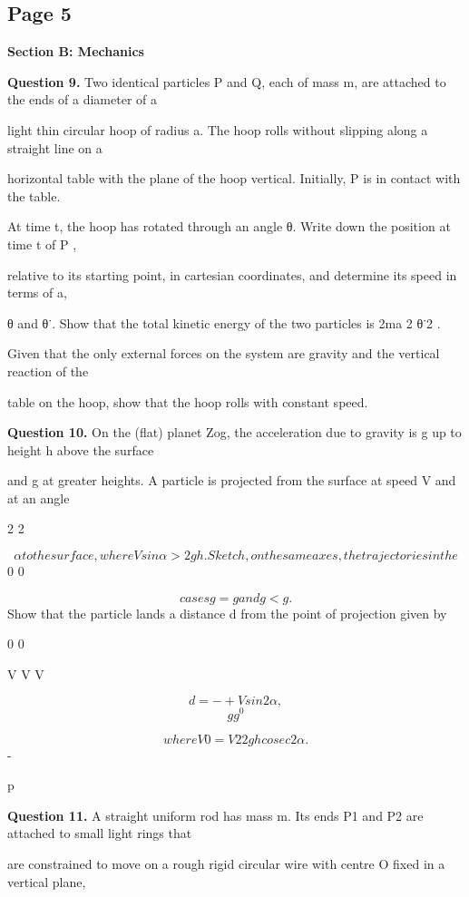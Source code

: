 \documentclass[12pt]{article}
\begin{document}
\subsection*{Page 5}
\begin{flushleft}
\bigskip\textbf{Section B: Mechanics}\par
\bigskip\textbf{Question 9.} Two identical particles P and Q, each of mass m, are attached to the ends of a diameter of a\par
light thin circular hoop of radius a. The hoop rolls without slipping along a straight line on a\par
horizontal table with the plane of the hoop vertical. Initially, P is in contact with the table.\par
At time t, the hoop has rotated through an angle θ. Write down the position at time t of P ,\par
relative to its starting point, in cartesian coordinates, and determine its speed in terms of a,\par
θ and θ˙. Show that the total kinetic energy of the two particles is 2ma 2 θ˙2 .\par
Given that the only external forces on the system are gravity and the vertical reaction of the\par
table on the hoop, show that the hoop rolls with constant speed.\par
\bigskip\textbf{Question 10.} On the (flat) planet Zog, the acceleration due to gravity is g up to height h above the surface\par
and g at greater heights. A particle is projected from the surface at speed V and at an angle\par
2 2\par
\[α to the surface, where V sin α > 2gh . Sketch, on the same axes, the trajectories in the\]
0 0\par
\[cases g = g and g < g.\]
Show that the particle lands a distance d from the point of projection given by\par
0 0\par
V V V\par
\[d = - + V sin 2α ,\]
\[g g^0\]
\lambda \mu\par
\[where V 0 = V 2 2gh cosec2α .\]
-\par
p\par
\bigskip\textbf{Question 11.} A straight uniform rod has mass m. Its ends P1 and P2 are attached to small light rings that\par
are constrained to move on a rough rigid circular wire with centre O fixed in a vertical plane,\par

\end{flushleft}
\end{document}
